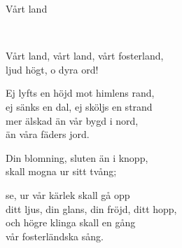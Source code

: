 \begin{song}{Vårt land}
	
	
	\\
	
	Vårt land, vårt land, vårt fosterland,\\
	ljud högt, o dyra ord!\\
	\begin{repetition}
		Ej lyfts en höjd mot himlens rand,\\
		ej sänks en dal, ej sköljs en strand\\
		mer älskad än vår bygd i nord,\\
		än våra fäders jord.
	\end{repetition}
	
	Din blomning, sluten än i knopp,\\
	skall mogna ur sitt tvång;\\
	\begin{repetition}
		se, ur vår kärlek skall gå opp\\
		ditt ljus, din glans, din fröjd, ditt hopp,\\
		och högre klinga skall en gång\\
		vår fosterländska sång.
	\end{repetition}
	
\end{song}
